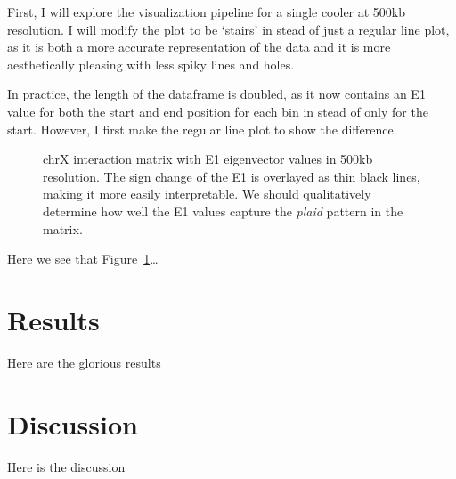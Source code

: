 \documentclass[
  a4paper,
  DIV=11,
  numbers=noendperiod]{scrartcl}
\begin{document}
\label{md-plotting-500kb-single}
First, I will explore the visualization pipeline for a single cooler at
500kb resolution. I will modify the plot to be `stairs' in stead of just
a regular line plot, as it is both a more accurate representation of the
data and it is more aesthetically pleasing with less spiky lines and
holes.

In practice, the length of the dataframe is doubled, as it now contains
an E1 value for both the start and end position for each bin in stead of
only for the start. However, I first make the regular line plot to show
the difference.

\begin{figure}[H]


\caption{\label{fig-matrix_e1_500kb}chrX interaction matrix with E1
eigenvector values in 500kb resolution. The sign change of the E1 is
overlayed as thin black lines, making it more easily interpretable. We
should qualitatively determine how well the E1 values capture the
\emph{plaid} pattern in the matrix.}

\end{figure}%

Here we see that Figure~\ref{fig-matrix_e1_500kb}\ldots{}

\section{Results}\label{results}

Here are the glorious results

\section{Discussion}\label{discussion}

Here is the discussion


\renewcommand\refname{Bibliography}
  
\end{document}
